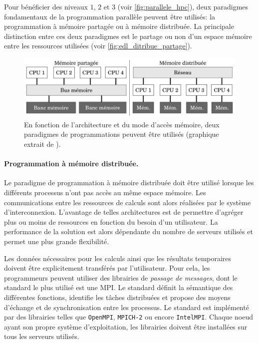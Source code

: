         Pour bénéficier des niveaux $1$, $2$ et $3$ (voir \autoref{fig:parallele_hpc}), deux paradigmes fondamentaux de la programmation parallèle peuvent être utilisés: la programmation à mémoire partagée ou à mémoire distribuée. La principale distinction entre ces deux paradigmes est le partage ou non d'un espace mémoire entre les ressources utilisées (voir \autoref{fig:edl_ditribue_partage}). 
        
            \begin{figure}
                \center
                \includegraphics[width=14cm]{images/edl_ditribue_partage.png}
                \caption{\label{fig:edl_ditribue_partage} En fonction de l'architecture et du mode d'accès mémoire, deux paradigmes de programmations peuvent être utilisés (graphique extrait de \cite{Valat2016a}).}
            \end{figure}
        
        
        
            
        \paragraph{Programmation à mémoire distribuée.}  
               
            Le paradigme de programmation à mémoire distribuée doit être utilisé lorsque les différents processus n'ont pas accès au même espace mémoire. Les communications entre les ressources de calculs sont alors réalisées par le système d'interconnexion. L'avantage de telles architectures est de permettre d'agréger plus ou moins de ressources en fonction du besoin d'un utilisateur. La performance de la solution est alors dépendante du nombre de serveurs utilisés et permet une plus grande flexibilité. 
            
            Les données nécessaires pour les calculs ainsi que les résultats temporaires doivent être explicitement transférés par l'utilisateur. Pour cela, les programmeurs peuvent utiliser des librairies de \textit{passage de messages}, dont le standard le plus utilisé est une \gls{MPI}. Le standard définit la sémantique des différentes fonctions, identifie les tâches distribuées et propose des moyens d'échange et de synchronisation entre les processus. Le standard est implémenté par des librairies telles que \verb|OpenMPI|, \verb|MPICH-2| ou encore \verb|IntelMPI|. Chaque noeud ayant son propre système d'exploitation, les librairies doivent être installées sur tous les serveurs utilisés. 
        
